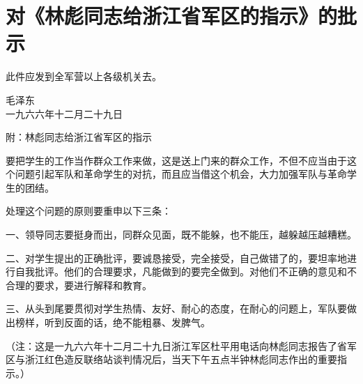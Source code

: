 \section[对《林彪同志给浙江省军区的指示》的批示（一九六六年十二月二十九日）]{对《林彪同志给浙江省军区的指示》的批示}


此件应发到全军营以上各级机关去。
{\raggedleft 毛泽东\\一九六六年十二月二十九日\par}

附：林彪同志给浙江省军区的指示

要把学生的工作当作群众工作来做，这是送上门来的群众工作，不但不应当由于这个问题引起军队和革命学生的对抗，而且应当借这个机会，大力加强军队与革命学生的团结。

处理这个问题的原则要重申以下三条：

一、领导同志要挺身而出，同群众见面，既不能躲，也不能压，越躲越压越糟糕。

二、对学生提出的正确批评，要诚恳接受，完全接受，自己做错了的，要坦率地进行自我批评。他们的合理要求，凡能做到的要完全做到。对他们不正确的意见和不合理的要求，要进行解释和教育。

三、从头到尾要贯彻对学生热情、友好、耐心的态度，在耐心的问题上，军队要做出榜样，听到反面的话，绝不能粗暴、发脾气。

（注：这是一九六六年十二月二十九日浙江军区杜平用电话向林彪同志报告了省军区与浙江红色造反联络站谈判情况后，当天下午五点半钟林彪同志作出的重要指示。）


